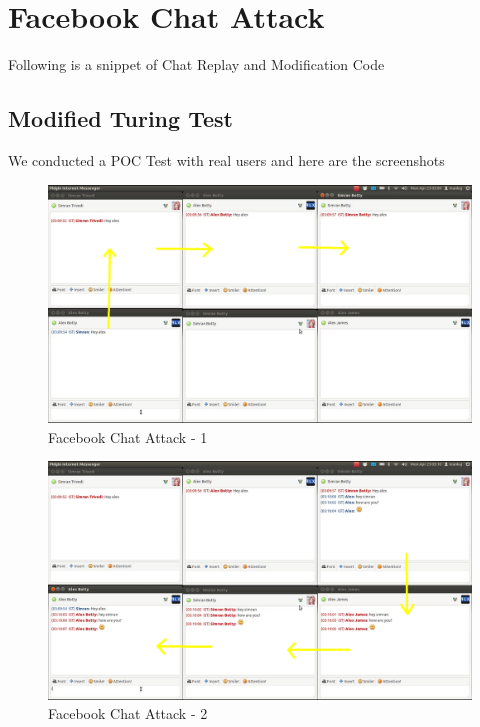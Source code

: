 \section{Facebook Chat Attack}

Following is a snippet of Chat Replay and Modification Code


\subsection{Modified Turing Test}

We conducted a POC Test with real users and here are the screenshots

\begin{figure}[H]
\centering
\includegraphics[scale=0.6, angle=90]{project/diagrams/attack1}
\caption{Facebook Chat Attack - 1}
\label{fig:attack1}
\end{figure}

\begin{figure}[H]
\centering
\includegraphics[scale=0.6, angle=90]{project/diagrams/attack2}
\caption{Facebook Chat Attack - 2}
\label{fig:attack1}
\end{figure}

